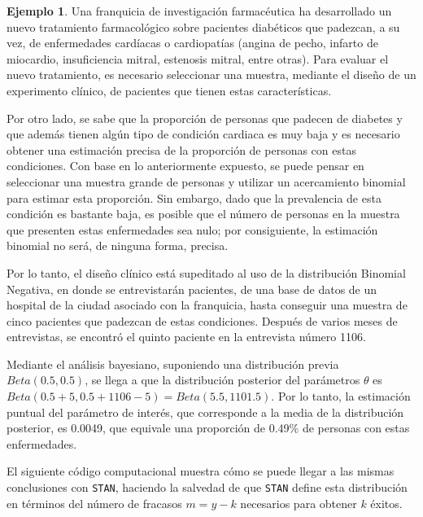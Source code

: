 \documentclass[
  10pt,
  spanish,
]{book}
\theoremstyle{definition}
\theoremstyle{definition}
\newtheorem{example}{Ejemplo}[chapter]
\theoremstyle{definition}
\theoremstyle{definition}
\theoremstyle{remark}
\begin{document}
\begin{example}
\protect\hypertarget{exm:unnamed-chunk-34}{}{\label{exm:unnamed-chunk-34} }Una franquicia de investigación farmacéutica ha desarrollado un nuevo tratamiento farmacológico sobre pacientes diabéticos que padezcan, a su vez, de enfermedades cardíacas o cardiopatías (angina de pecho, infarto de miocardio, insuficiencia mitral, estenosis mitral, entre otras). Para evaluar el nuevo tratamiento, es necesario seleccionar una muestra, mediante el diseño de un experimento clínico, de pacientes que tienen estas características.

Por otro lado, se sabe que la proporción de personas que padecen de diabetes y que además tienen algún tipo de condición cardiaca es muy baja y es necesario obtener una estimación precisa de la proporción de personas con estas condiciones. Con base en lo anteriormente expuesto, se puede pensar en seleccionar una muestra grande de personas y utilizar un acercamiento binomial para estimar esta proporción. Sin embargo, dado que la prevalencia de esta condición es bastante baja, es posible que el número de personas en la muestra que presenten estas enfermedades sea nulo; por consiguiente, la estimación binomial no será, de ninguna forma, precisa.

Por lo tanto, el diseño clínico está supeditado al uso de la distribución Binomial Negativa, en donde se entrevistarán pacientes, de una base de datos de un hospital de la ciudad asociado con la franquicia, hasta conseguir una muestra de cinco pacientes que padezcan de estas condiciones. Después de varios meses de entrevistas, se encontró el quinto paciente en la entrevista número 1106.

Mediante el análisis bayesiano, suponiendo una distribución previa \(Beta(0.5, 0.5)\), se llega a que la distribución posterior del parámetros \(\theta\) es \(Beta(0.5+5, 0.5+1106-5)=Beta(5.5, 1101.5)\). Por lo tanto, la estimación puntual del parámetro de interés, que corresponde a la media de la distribución posterior, es 0.0049, que equivale una proporción de 0.49\% de personas con estas enfermedades.

El siguiente código computacional muestra cómo se puede llegar a las mismas conclusiones con \texttt{STAN}, haciendo la salvedad de que \texttt{STAN} define esta distribución en términos del número de fracasos \(m = y - k\) necesarios para obtener \(k\) éxitos.
\end{example}
\end{document}
